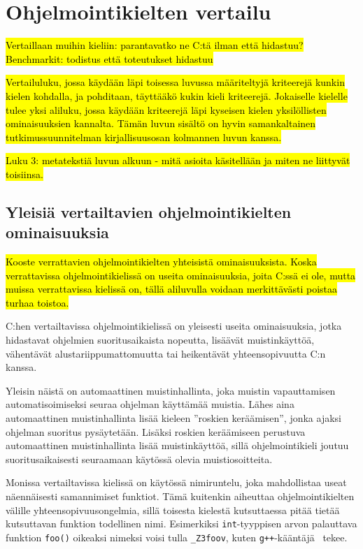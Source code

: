 \section{Ohjelmointikielten vertailu}
\label{sec:muut}

\hl{Vertaillaan muihin kieliin: parantavatko ne C:tä ilman että hidastuu?
Benchmarkit: todistus että toteutukset hidastuu}

\hl{Vertailuluku, jossa käydään läpi toisessa luvussa määriteltyjä kriteerejä
kunkin kielen kohdalla, ja pohditaan, täyttääkö kukin kieli kriteerejä.
Jokaiselle kielelle tulee yksi aliluku, jossa käydään kriteerejä läpi kyseisen
kielen yksilöllisten ominaisuuksien kannalta. Tämän luvun sisältö on hyvin
samankaltainen tutkimussuunnitelman kirjallisuusosan kolmannen luvun kanssa.}

\hl{ Luku 3: metatekstiä luvun alkuun - mitä asioita käsitellään ja miten ne
liittyvät toisiinsa. }

\subsection{Yleisiä vertailtavien ohjelmointikielten ominaisuuksia}
\label{sec:muut:common}

\hl{Kooste verrattavien ohjelmointikielten yhteisistä ominaisuuksista. Koska
verrattavissa ohjelmointikielissä on useita ominaisuuksia, joita C:ssä ei ole,
mutta muissa verrattavissa kielissä on, tällä aliluvulla voidaan merkittävästi
poistaa turhaa toistoa.}

C:hen vertailtavissa ohjelmointikielissä on yleisesti useita ominaisuuksia,
jotka hidastavat ohjelmien suoritusaikaista nopeutta, lisäävät muistinkäyttöä,
vähentävät alustariippumattomuutta tai heikentävät yhteensopivuutta C:n kanssa.

Yleisin näistä on automaattinen muistinhallinta, joka muistin vapauttamisen
automatisoimiseksi seuraa ohjelman käyttämää muistia. Lähes aina automaattinen
muistinhallinta lisää kieleen ''roskien keräämisen'', jonka ajaksi ohjelman suoritus pysäytetään. Lisäksi roskien
keräämiseen perustuva automaattinen muistinhallinta lisää muistinkäyttöä, sillä
ohjelmointikieli joutuu suoritusaikaisesti seuraamaan käytössä olevia
muistiosoitteita.

Monissa vertailtavissa kielissä on käytössä nimiruntelu,
joka mahdollistaa useat näennäisesti samannimiset funktiot. Tämä kuitenkin
aiheuttaa ohjelmointikielten välille yhteensopivuusongelmia, sillä toisesta
kielestä kutsuttaessa pitää tietää kutsuttavan funktion todellinen nimi.
Esimerkiksi \texttt{int}-tyyppisen arvon palauttava funktion \texttt{foo()}
oikeaksi nimeksi voisi tulla \texttt{\_Z3foov}, kuten
\texttt{g++}-kääntäjä~\citep{gcc} tekee.

